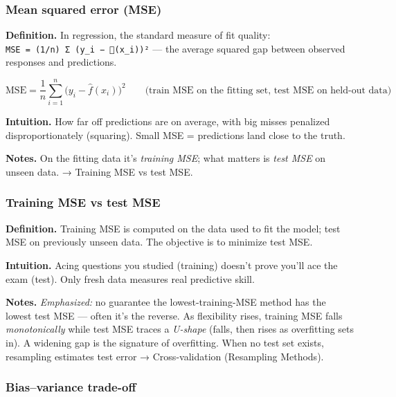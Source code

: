 \documentclass[
  10pt,
  letterpaper,
  onecolumn]{article}
\begin{document}
\hypertarget{mean-squared-error-mse}{%
\subsubsection{Mean squared error (MSE)}\label{mean-squared-error-mse}}

\textbf{Definition.} In regression, the standard measure of fit quality:
\texttt{MSE\ =\ (1/n)\ Σ\ (y\_i\ −\ (x\_i))²} --- the average squared
gap between observed responses and predictions.

\begin{equation*}
\mathrm{MSE}=\frac{1}{n}\sum_{i=1}^{n}\bigl(y_i-\hat f(x_i)\bigr)^2
\qquad\text{(train MSE on the fitting set, test MSE on held-out data)}
\end{equation*}

\textbf{Intuition.} How far off predictions are on average, with big
misses penalized disproportionately (squaring). Small MSE = predictions
land close to the truth.

\textbf{Notes.} On the fitting data it's \emph{training MSE}; what
matters is \emph{test MSE} on unseen data. → Training MSE vs test MSE.

\hypertarget{training-mse-vs-test-mse}{%
\subsubsection{Training MSE vs test
MSE}\label{training-mse-vs-test-mse}}

\textbf{Definition.} Training MSE is computed on the data used to fit
the model; test MSE on previously unseen data. The objective is to
minimize test MSE.

\textbf{Intuition.} Acing questions you studied (training) doesn't prove
you'll ace the exam (test). Only fresh data measures real predictive
skill.

\textbf{Notes.} \emph{Emphasized:} no guarantee the lowest-training-MSE
method has the lowest test MSE --- often it's the reverse. As
flexibility rises, training MSE falls \emph{monotonically} while test
MSE traces a \emph{U-shape} (falls, then rises as overfitting sets in).
A widening gap is the signature of overfitting. When no test set exists,
resampling estimates test error → Cross-validation (Resampling Methods).

\hypertarget{biasvariance-trade-off}{%
\subsubsection{Bias--variance trade-off}\label{biasvariance-trade-off}}
\end{document}
